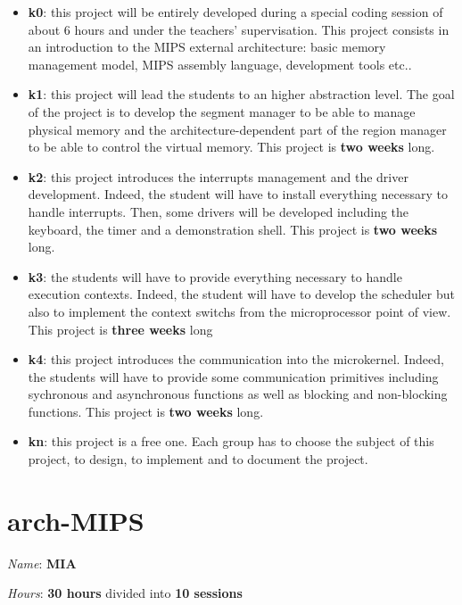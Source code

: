 \begin{multicols}{2}
\begin{itemize}
  \item
    \textbf{k0}: this project will be entirely developed during a
    special coding session of about 6 hours and under the teachers'
    supervisation. This project consists in an introduction to the
    MIPS external architecture: basic memory management model,
    MIPS assembly language, development tools etc..
  \item
    \textbf{k1}: this project will lead the students to an higher abstraction
    level. The goal of the project is to develop the segment manager to be
    able to manage physical memory and the architecture-dependent part of the
    region manager to be able to control the virtual memory. This project
    is \textbf{two weeks} long.
  \item
    \textbf{k2}: this project introduces the interrupts management and
    the driver development. Indeed, the student will have to install
    everything necessary to handle interrupts. Then, some drivers will
    be developed including the keyboard, the timer and a demonstration shell.
    This project is \textbf{two weeks} long.
  \item
    \textbf{k3}: the students will have to provide everything necessary
    to handle execution contexts. Indeed, the student will have to
    develop the scheduler but also to implement the context switchs from
    the microprocessor point of view. This project is \textbf{three weeks}
    long
  \item
    \textbf{k4}: this project introduces the communication into the
    microkernel. Indeed, the students will have to provide some
    communication primitives including sychronous and asynchronous
    functions as well as blocking and non-blocking functions. This project
    is \textbf{two weeks} long.
  \item
    \textbf{kn}: this project is a free one. Each group has to choose the
    subject of this project, to design, to implement and to document
    the project.
\end{itemize}

%
%

\section{arch-MIPS}

\textit{Name}: \textbf{MIA}

\textit{Hours}: \textbf{30 hours} divided into \textbf{10 sessions}


\end{multicols}
